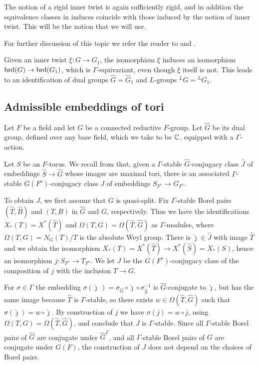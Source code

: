 \documentclass{article}
\theoremstyle{definition}
\numberwithin{equation}{section}
\renewcommand{\-}{\hyp{}}
\begin{document}
The notion of a rigid inner twist is again sufficiently rigid, and in addition the equivalence classes in induces coincide with those induced by the notion of inner twist. This will be the notion that we will use.

For further discussion of this topic we refer the reader to \cite{Vog93} and \cite{KalSimons}.

Given an inner twist $\xi : G \to G_1$, the isomorphism $\xi$ induces an isomorphism $\textrm{brd}(G) \to \textrm{brd}(G_1)$, which is $\Gamma$-equivariant, even though $\xi$ itself is not. This leads to an identification of dual groups $\hat G = \hat G_1$ and $L$\-groups $^LG = {^LG}_1$.


\subsection{Admissible embeddings of tori} \label{sub:adm}

Let $F$ be a field and let $G$ be a connected reductive $F$-group. Let $\hat G$ be its dual group, defined over any base field, which we take to be $\mathbb{C}$, equipped with a $\Gamma$-action.

Let $S$ be an $F$-torus. We recall from \cite[\S5.1]{KalRSP} that, given a $\Gamma$-stable $\hat G$-conjugacy class $\hat J$ of embeddings $\hat S \to \hat G$ whose images are maximal tori, there is an associated $\Gamma$-stable $G(F^s)$-conjugacy class $J$ of embeddings $S_{F^s} \to G_{F^s}$. 

To obtain $J$, we first assume that $G$ is quasi-split. Fix $\Gamma$-stable Borel pairs $(\hat T,\hat B)$ and $(T,B)$ in $\hat G$ and $G$, respectively. Thus we have the identifications $X_*(T)=X^*(\hat T)$ and $\Omega(T,G)=\Omega(\hat T,\hat G)$ as $\Gamma$-modules, where $\Omega(T,G)=N_G(T)/T$ is the absolute Weyl group. There is $\hat\jmath \in \hat J$ with image $\hat T$ and we obtain the isomorphism $X_*(T)=X^*(\hat T) \to X^*(\hat S)=X_*(S)$, hence an isomorphism $j : S_{F^s} \to T_{F^s}$. We let $J$ be the $G(F^s)$-conjugacy class of the composition of $j$ with the inclusion $T \to G$.

For $\sigma \in \Gamma$ the embedding $\sigma(\hat\jmath\,)=\sigma_{\hat G}\circ \hat\jmath \circ \sigma_{\hat S}^{-1}$ is $\hat G$-conjugate to $\hat\jmath$, but has the same image because $\hat T$ is $\Gamma$-stable, so there exists $w \in \Omega(\hat T,\hat G)$ such that $\sigma(\hat\jmath)=w\circ\hat\jmath$. By construction of $j$ we have $\sigma(j)=w\circ j$, using $\Omega(T,G)=\Omega(\hat T,\hat G)$, and conclude that $J$ is $\Gamma$-stable. Since all $\Gamma$-stable Borel pairs of $\hat G$ are conjugate under $\hat G^\Gamma$, and all $\Gamma$-stable Borel pairs of $G$ are conjugate under $G(F)$, the construction of $J$ does not depend on the choices of Borel pairs.
\end{document}
